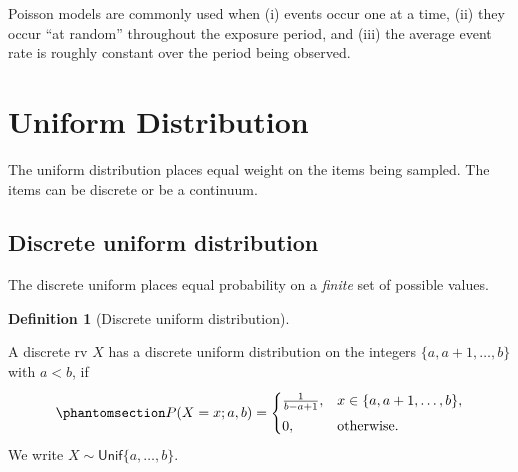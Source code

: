 \documentclass[
  a4paper,
  DIV=11,
  numbers=noendperiod,
  oneside]{scrreprt}
\theoremstyle{plain}
\theoremstyle{definition}
\theoremstyle{definition}
\newtheorem{definition}{Definition}[chapter]
\theoremstyle{definition}
\theoremstyle{plain}
\theoremstyle{remark}
\begin{document}
\begin{tcolorbox}[enhanced jigsaw, toprule=.15mm, colbacktitle=quarto-callout-note-color!10!white, breakable, toptitle=1mm, title=\textcolor{quarto-callout-note-color}{\faInfo}\hspace{0.5em}{When does Poisson modelling make sense?}, left=2mm, leftrule=.75mm, colback=white, colframe=quarto-callout-note-color-frame, coltitle=black, opacitybacktitle=0.6, rightrule=.15mm, titlerule=0mm, bottomrule=.15mm, bottomtitle=1mm, arc=.35mm, opacityback=0]

Poisson models are commonly used when (i) events occur one at a time,
(ii) they occur ``at random'' throughout the exposure period, and (iii)
the average event rate is roughly constant over the period being
observed.

\end{tcolorbox}

\section{Uniform Distribution}\label{sec-uniform-distribution}

The uniform distribution places equal weight on the items being sampled.
The items can be discrete or be a continuum.

\subsection{Discrete uniform
distribution}\label{sec-discrete-uniform-distribution}

The discrete uniform places equal probability on a \emph{finite} set of
possible values.

\begin{definition}[Discrete uniform
distribution]\protect\hypertarget{def-discrete-uniform}{}\label{def-discrete-uniform}

A discrete rv \(X\) has a discrete uniform distribution on the integers
\(\{a,a+1,\dots,b\}\) with \(a<b\), if
\begin{equation}\phantomsection\label{eq-discrete-uniform-pmf}{
P(X=x; a,b) =
\begin{cases}
\frac{1}{b-a+1}, & x \in \{a,a+1,\dots,b\},\\[4pt]
0, & \text{otherwise}.
\end{cases}
}\end{equation} We write \(X \sim \mathsf{Unif}\{a,\dots,b\}\).

\end{definition}
\end{document}
